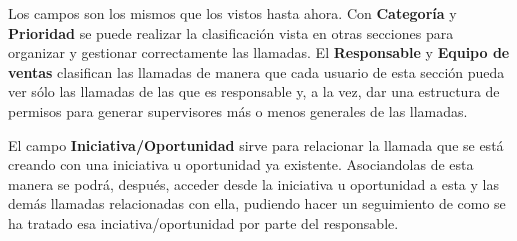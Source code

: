 Los campos son los mismos que los vistos hasta ahora. Con \textbf{Categoría} y \textbf{Prioridad} se puede realizar la clasificación 
vista en otras secciones para organizar y gestionar correctamente las llamadas. El \textbf{Responsable} y \textbf{Equipo de ventas} clasifican las llamadas de manera que cada usuario de esta sección pueda ver sólo las llamadas de las que es responsable y, a la vez, dar
una estructura de permisos para generar supervisores más o menos generales de las llamadas.

El campo \textbf{Iniciativa/Oportunidad} sirve para relacionar la llamada que se está creando con una iniciativa u oportunidad ya existente. Asociandolas de esta manera se podrá, después, acceder desde la iniciativa u oportunidad a esta y las demás llamadas relacionadas con ella, pudiendo hacer un seguimiento de como se ha tratado esa inciativa/oportunidad por parte del responsable.

